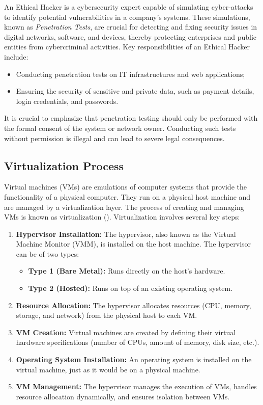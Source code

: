An Ethical Hacker is a cybersecurity expert capable of simulating cyber-attacks to identify potential vulnerabilities in a company's systems. These simulations, known as \emph{Penetration Tests}, are crucial for detecting and fixing security issues in digital networks, software, and devices, thereby protecting enterprises and public entities from cybercriminal activities. Key responsibilities of an Ethical Hacker include:
\begin{itemize}
    \item Conducting penetration tests on IT infrastructures and web applications;
    \item Ensuring the security of sensitive and private data, such as payment details, login credentials, and passwords.
\end{itemize}

It is crucial to emphasize that penetration testing should only be performed with the formal consent of the system or network owner. Conducting such tests without permission is illegal and can lead to severe legal consequences.


\subsection{Virtualization Process}
Virtual machines (VMs) are emulations of computer systems that provide the functionality of a physical computer. They run on a physical host machine and are managed by a virtualization layer. The process of creating and managing VMs is known as virtualization ().
Virtualization involves several key steps:

\begin{enumerate}
    \item \textbf{Hypervisor Installation:} The hypervisor, also known as the Virtual Machine Monitor (VMM), is installed on the host machine. The hypervisor can be of two types:
    \begin{itemize}
        \item \textbf{Type 1 (Bare Metal):} Runs directly on the host's hardware.
        \item \textbf{Type 2 (Hosted):} Runs on top of an existing operating system.
    \end{itemize}
    \item \textbf{Resource Allocation:} The hypervisor allocates resources (CPU, memory, storage, and network) from the physical host to each VM.
    \item \textbf{VM Creation:} Virtual machines are created by defining their virtual hardware specifications (number of CPUs, amount of memory, disk size, etc.).
    \item \textbf{Operating System Installation:} An operating system is installed on the virtual machine, just as it would be on a physical machine.
    \item \textbf{VM Management:} The hypervisor manages the execution of VMs, handles resource allocation dynamically, and ensures isolation between VMs.
\end{enumerate}


